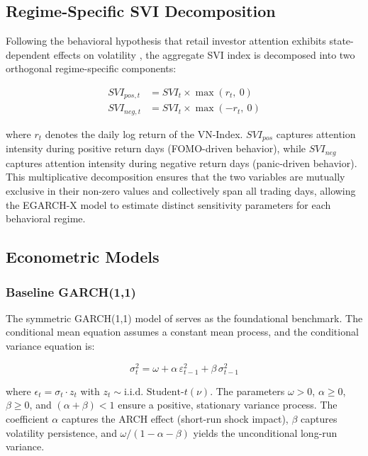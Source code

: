 \documentclass[12pt, a4paper]{article}
\begin{document}
\subsection{Regime-Specific SVI Decomposition}

Following the behavioral hypothesis that retail investor attention exhibits state-dependent effects on volatility \citep{fong2002, vozlyublennaia2014}, the aggregate SVI index is decomposed into two orthogonal regime-specific components:

\begin{align}
  SVI_{pos,t} &= SVI_t \times \max(r_t,\ 0) \label{eq:svipos} \\
  SVI_{neg,t} &= SVI_t \times \max(-r_t,\ 0) \label{eq:svineg}
\end{align}

where $r_t$ denotes the daily log return of the VN-Index. $SVI_{pos}$ captures attention intensity during positive return days (FOMO-driven behavior), while $SVI_{neg}$ captures attention intensity during negative return days (panic-driven behavior). This multiplicative decomposition ensures that the two variables are mutually exclusive in their non-zero values and collectively span all trading days, allowing the EGARCH-X model to estimate distinct sensitivity parameters for each behavioral regime.

\subsection{Econometric Models}

\subsubsection{Baseline GARCH(1,1)}

The symmetric GARCH(1,1) model of \citet{bollerslev1986} serves as the foundational benchmark. The conditional mean equation assumes a constant mean process, and the conditional variance equation is:

\begin{equation}
  \sigma^{2}_{t} = \omega + \alpha\,\varepsilon^{2}_{t-1} + \beta\,\sigma^{2}_{t-1}
  \label{eq:garch}
\end{equation}

where $\epsilon_t = \sigma_t \cdot z_t$ with $z_t \sim \text{i.i.d. Student-}t(\nu)$. The parameters $\omega > 0$, $\alpha \geq 0$, $\beta \geq 0$, and $(\alpha + \beta) < 1$ ensure a positive, stationary variance process. The coefficient $\alpha$ captures the ARCH effect (short-run shock impact), $\beta$ captures volatility persistence, and $\omega / (1 - \alpha - \beta)$ yields the unconditional long-run variance.
\end{document}
